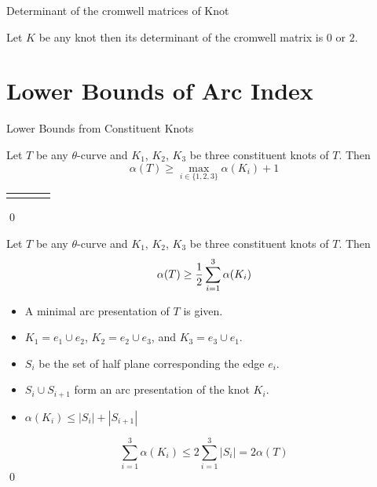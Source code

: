 \begin{frame}{Determinant of the cromwell matrices of Knot}
	\begin{thm}
		Let $K$ be any knot then its determinant of the cromwell matrix is $0$ or $2$.
	\end{thm}
\end{frame}

\section{Lower Bounds of Arc Index}

\begin{frame}{Lower Bounds from Constituent Knots}
	\begin{thm}
		Let $T$ be any $\theta$-curve
		and $K_1$, $K_2$, $K_3$ be three constituent knots of $T$.
		Then
		\[
			\alpha(T) \ge \max_{i\in\{1,2,3\}} \alpha(K_i) + 1
		\]
	\end{thm}

	\mypf

	\begin{tabu}{X[c]X[c]X[c]X[c]}
			 &
			 &
			 &
	\end{tabu}
	\hfill\qed
\end{frame}


\begin{frame}
	\bigskip
	\begin{thm}
		Let $T$ be any $\theta$-curve
		and $K_1$, $K_2$, $K_3$ be three constituent knots of $T$.
		Then
		\[
			\centerline{$\displaystyle\alpha(T) \ge \frac12 \sum_{i=1}^3\alpha(K_i)$}
		\]
	\end{thm}
	
	\mypf

	\begin{itemize}
		\item A minimal arc presentation of $T$ is given.
		\item $K_1 = e_1\cup e_2$, $K_2 = e_2\cup e_3$, and $K_3 = e_3\cup e_1$.
		\item $S_i$ be the set of half plane corresponding the edge $e_i$.
		\item $S_i\cup S_{i+1}$ form an arc presentation of the knot $K_i$.
		\item $\alpha(K_i) \le |S_i| + |S_{i+1}|$
	\end{itemize}
	\[
		\sum_{i=1}^3 \alpha(K_i) \le 2\sum_{i=1}^3|S_i| = 2 \alpha(T)
	\]
	\hfill\qed
\end{frame}


